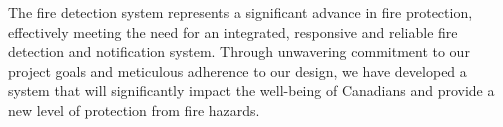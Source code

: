 The fire detection system represents a significant advance in fire protection, effectively meeting the need for an
integrated, responsive and reliable fire detection and notification system. Through unwavering commitment to our
project goals and meticulous adherence to our design, we have developed a system that will significantly impact the
well-being of Canadians and provide a new level of protection from fire hazards.
